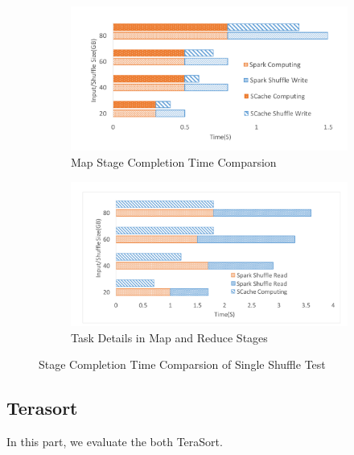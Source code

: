 \begin{figure}
\begin{subfigure}{\linewidth}
	\includegraphics[width=\linewidth]{fig/groupbymaptask}
	\caption{Map Stage Completion Time Comparsion}
	\label{fig:maptask}
\end{subfigure}
\begin{subfigure}{\linewidth}
	\includegraphics[width=\linewidth]{fig/groupbyreducetask}
	\caption{Task Details in Map and Reduce Stages}
	\label{fig:reducetask}
\end{subfigure}
\caption{Stage Completion Time Comparsion of Single Shuffle Test}
\label{fig:singleshuffletask}
\end{figure}


\subsection{Terasort}
In this part, we evaluate the both TeraSort\cite{spark-tera}. 


